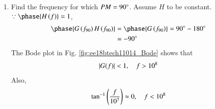 \begin{enumerate}[label=\thesection.\arabic*.,ref=\thesection.\theenumi]
\item Find the frequency for which $PM = 90 \degree$.  Assume $H$ to be constant.
\\
\solution $\because \phase{H\brak{f}} = 1$, 
\begin{align}
\phase{G\brak{f_{90}}H\brak{f_{90}}} &= \phase{G\brak{f_{90}}} = 90\degree - 180\degree
\\
&= -90\degree
\label{eq:ee18btech11014_Gpm90}
\end{align}
%
The Bode plot in Fig.  	\ref{fig:ee18btech11014_Bode} shows that 
\begin{align}
\left\vert G(f)\right\vert < 1, \quad f > 10^8
\end{align}
%
Also, 
\begin{align}
\tan^{-1}\left(\frac{f}{10^{7}}\right) \approx 0, \quad f < 10^8
\end{align}


\end{enumerate}
